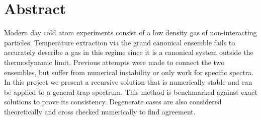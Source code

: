 \chapter*{Abstract}\label{ch:abstract}
Modern day cold atom experiments consist of a low density gas of non-interacting particles. Temperature extraction via the grand canonical ensemble fails to accurately describe a gas in this regime since it is a canonical system outside the thermodynamic limit. Previous attempts were made to connect the two ensembles, but suffer from numerical instability or only work for specific spectra. In this project we present a recursive solution that is numerically stable and can be applied to a general trap spectrum. This method is benchmarked against exact solutions to prove its consistency. Degenerate cases are also considered theoretically and cross checked numerically to find agreement. 